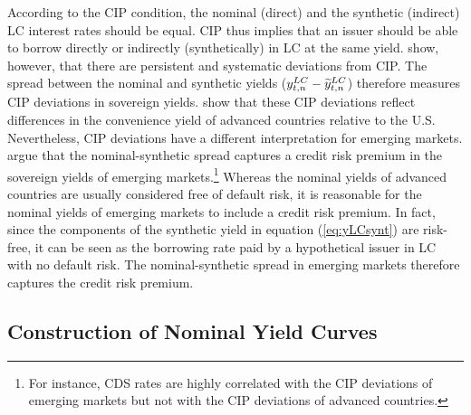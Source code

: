 {According to the CIP condition, the nominal (direct) and the synthetic (indirect) LC interest rates should be equal. 
CIP thus implies that an 
issuer should be able to borrow directly or indirectly (synthetically) in LC at the same yield. 
\cite*{DuTepperVerdelhan:2018} show, however, that there are persistent and systematic deviations from CIP. 
The spread between the nominal and synthetic yields ($y_{t,n} ^{LC} - \widetilde{y}_{t,n} ^{LC}$) therefore measures CIP deviations in sovereign yields.
\cite*{DuImSchreger:2018JIE} show that these CIP deviations reflect differences in the convenience yield of advanced countries relative to the U.S.
Nevertheless, CIP deviations have a different interpretation for emerging markets. \cite{DuSchreger:2016JoF} argue that the nominal-synthetic spread captures a credit risk premium in the sovereign yields of emerging markets.\footnote{ For instance, CDS rates are highly correlated with the CIP deviations of emerging markets but not with the CIP deviations of advanced countries.}
Whereas the nominal yields of advanced countries are usually considered free of default risk, it is reasonable for the nominal yields of emerging markets to include a credit risk premium.
In fact, since the components of the synthetic yield in equation (\ref{eq:yLCsynt}) are risk-free, it can be seen as the borrowing rate paid by a hypothetical issuer in LC with no default risk. 
The nominal-synthetic spread in emerging markets therefore captures the credit risk premium.



\subsection{Construction of Nominal Yield Curves} \label{sec:YCnom}
\iftoggle{toclinks}{\gototoc}{} %

}

